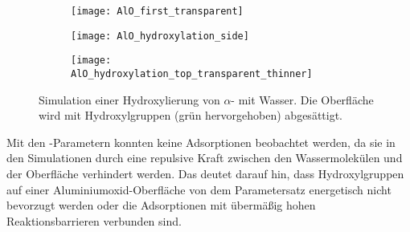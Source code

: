 \begin{figure}[t]
  \centering
  \captionsetup[subfigure]{singlelinecheck=false}

  \begin{subfigure}[c]{7.5cm}
    \begin{framed}
      \hspace{0.5em}
      \hspace{0.5em}
      \hspace{0.5em}
    \end{framed}
  \end{subfigure}

  \vspace{1em}

  \def\subfigwidth{0.32\textwidth}
  \begin{subfigure}[t]{\subfigwidth}
    \texttt{[image: AlO\_first\_transparent]}
    \label{fig:wateraluminasurface-a}
  \end{subfigure}
  \hfill
  \begin{subfigure}[t]{\subfigwidth}
    \texttt{[image: AlO\_hydroxylation\_side]}
    \label{fig:wateraluminasurface-b}
  \end{subfigure}
  \hfill
  \begin{subfigure}[t]{\subfigwidth}
    \texttt{[image: AlO\_hydroxylation\_top\_transparent\_thinner]}
    \label{fig:wateraluminasurface-c}
  \end{subfigure}
  \caption{
    Simulation einer Hydroxylierung von $\alpha$- mit Wasser.
    Die Oberfläche wird mit Hydroxylgruppen (grün hervorgehoben) abgesättigt.
  }
  \label{fig:wateraluminasurface}
\end{figure}

Mit den -Parametern konnten keine Adsorptionen beobachtet werden, da sie in den Simulationen durch eine repulsive Kraft zwischen den Wassermolekülen und der Oberfläche verhindert werden.
Das deutet darauf hin, dass Hydroxylgruppen auf einer Aluminiumoxid-Oberfläche von dem Parametersatz energetisch nicht bevorzugt werden oder die Adsorptionen mit übermäßig hohen Reaktionsbarrieren verbunden sind.

